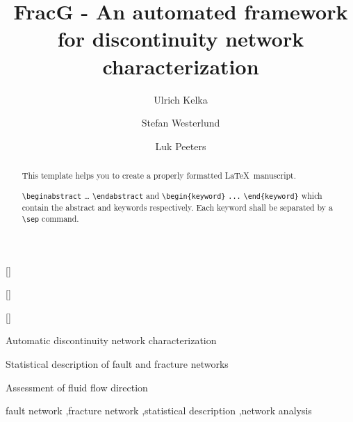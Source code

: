 \documentclass[a4paper,fleqn]{cas-sc}
\begin{document}
\let\WriteBookmarks\relax
\def\floatpagepagefraction{1}
\def\textpagefraction{.001}

\title [mode = title]{FracG - An automated framework for discontinuity network characterization}                      
\tnotemark[1,2]


\author[1]{Ulrich Kelka}[]
\cormark[1]
\address[1]{}

\author[1]{Stefan Westerlund}[]
\address[2]{}

\author[2]{Luk Peeters}[]
\address[2]{}

\begin{abstract}
This template helps you to create a properly formatted \LaTeX\ manuscript.

\noindent\texttt{\textbackslash begin{abstract}} \dots 
\texttt{\textbackslash end{abstract}} and
\verb+\begin{keyword}+ \verb+...+ \verb+\end{keyword}+ 
which
contain the abstract and keywords respectively. 
Each keyword shall be separated by a \verb+\sep+ command.
\end{abstract}

\begin{highlights}
\item Automatic discontinuity network characterization
\item Statistical description of fault and fracture networks
\item Assessment of fluid flow direction
\end{highlights}

\begin{keywords}
fault network \sep fracture network \sep statistical description \sep network analysis 
\end{keywords}

\end{document}
